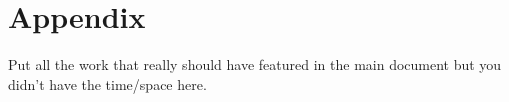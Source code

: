 \chapter*{Appendix}

Put all the work that really should have featured in the main document but you didn't have the time/space here.